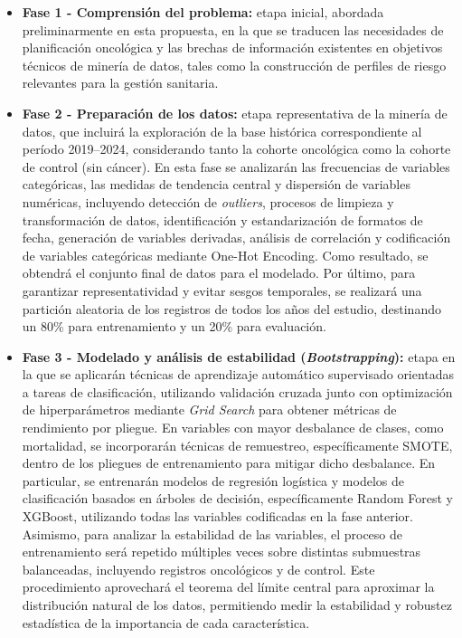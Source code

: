 \begin{itemize}

\item \textbf{Fase 1 - Comprensión del problema:} etapa inicial, abordada preliminarmente en esta propuesta, en la que se traducen las necesidades de planificación oncológica y las brechas de información existentes en objetivos técnicos de minería de datos, tales como la construcción de perfiles de riesgo relevantes para la gestión sanitaria.

\item \textbf{Fase 2 - Preparación de los datos:} etapa representativa de la minería de datos, que incluirá la exploración de la base histórica correspondiente al período 2019--2024, considerando tanto la cohorte oncológica como la cohorte de control (sin cáncer). En esta fase se analizarán las frecuencias de variables categóricas, las medidas de tendencia central y dispersión de variables numéricas, incluyendo detección de \textit{outliers}, procesos de limpieza y transformación de datos, identificación y estandarización de formatos de fecha, generación de variables derivadas, análisis de correlación y codificación de variables categóricas mediante One-Hot Encoding. Como resultado, se obtendrá el conjunto final de datos para el modelado. Por último, para garantizar representatividad y evitar sesgos temporales, se realizará una partición aleatoria de los registros de todos los años del estudio, destinando un 80\% para entrenamiento y un 20\% para evaluación.

\item \textbf{Fase 3 - Modelado y análisis de estabilidad (\textit{Bootstrapping}):} etapa en la que se aplicarán técnicas de aprendizaje automático supervisado orientadas a tareas de clasificación, utilizando validación cruzada junto con optimización de hiperparámetros mediante \textit{Grid Search} para obtener métricas de rendimiento por pliegue. En variables con mayor desbalance de clases, como mortalidad, se incorporarán técnicas de remuestreo, específicamente SMOTE, dentro de los pliegues de entrenamiento para mitigar dicho desbalance. En particular, se entrenarán modelos de regresión logística y modelos de clasificación basados en árboles de decisión, específicamente Random Forest y XGBoost, utilizando todas las variables codificadas en la fase anterior. Asimismo, para analizar la estabilidad de las variables, el proceso de entrenamiento será repetido múltiples veces sobre distintas submuestras balanceadas, incluyendo registros oncológicos y de control. Este procedimiento aprovechará el teorema del límite central para aproximar la distribución natural de los datos, permitiendo medir la estabilidad y robustez estadística de la importancia de cada característica.


\end{itemize}
